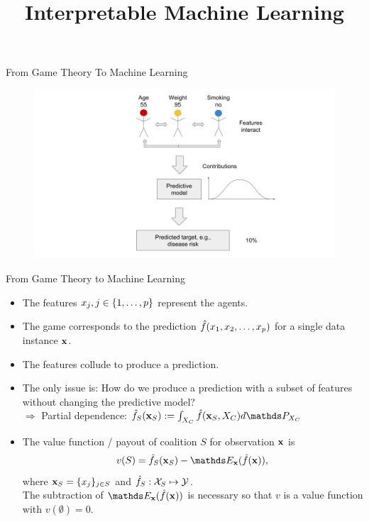 \documentclass[11pt,compress,t,notes=noshow, aspectratio=169, xcolor=table]{beamer}
\title{Interpretable Machine Learning}
\date{}
\begin{document}
\newcommand{\titlefigure}{figure_man/shapley_valuefct.png}
\newcommand{\learninggoals}{
\item See model predictions as a cooperative game.
\item Transfer the Shapley value concept from game theory to machine learning.
}



\begin{vbframe}{From Game Theory To Machine Learning}

\begin{figure}
    \centering
    \includegraphics{figure/Shapley_6.png}
\end{figure}

\end{vbframe}

\begin{vbframe}{From Game Theory to Machine Learning}
\begin{itemize}
    \itemsep1em
    \item The features $x_j, j \in \pset$ represent the agents.
    \item The game corresponds to the prediction $\fh(x_1, x_2, \ldots, x_p)$ for a single data instance $\xv$.
    \item The features collude to produce a prediction.
    \item The only issue is: How do we produce a prediction with a subset of features without changing the predictive model?
    \\ $\Rightarrow$ Partial dependence: $\fh_{S}(\xv_S) := \int_{X_C} \fh(\xv_S, X_C)d \P_{X_C}$
    \item  The value function / payout of coalition $S$ for observation $\xv$ is
    $$v(S) =  \fh_{S} (\xv_S) - \E_{\xv}(\fh(\xv)),$$ 
    where $\xv_S = \{x_j\}_{j \in S}$ and $\fh_S: \Xspace_S \mapsto \Yspace$. \\ The subtraction of $\E_{\xv}(\fh(\xv))$ is necessary so that $v$ is a value function with $v(\emptyset) = 0$.
\end{itemize}
\end{vbframe}
\end{document}
